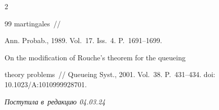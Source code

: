 \begin{multicols}{2}
{{\begin{thebibliography}{99}
{martingales}~//

   Ann. Probab., 1989. Vol.~17. Iss.~4. P.~1691--1699.

  


 On the modification of Rouche's theorem for the queueing

  theory problems~// Queueing Syst., 2001. Vol.~38. P.~431--434. doi: 10.1023/A:1010999928701.

  

  \end{thebibliography}



 }

 }



\end{multicols}



\vspace*{-9pt}



\hfill{\small\textit{Поступила в~редакцию 04.03.24}}









\newpage



\vspace*{-28pt}












\vspace*{-2pt}





\def\tit{TOWARDS A DEFINITION OF~A~BUSY PERIOD\\ UNDER~NONLOCAL DESCRIPTION OF~INPUT FLOWS}





\def\titkol{Towards a definition of~a~busy period under~nonlocal description of~input flows}





